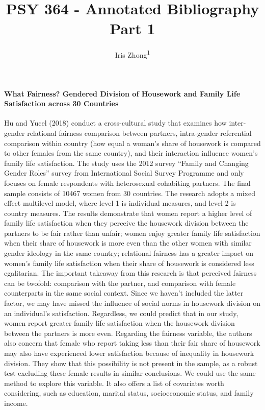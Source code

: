 \documentclass[
  english,
  man]{apa6}
\title{PSY 364 - Annotated Bibliography Part 1}
\author{Iris Zhong\textsuperscript{1}}
\date{}
\affiliation{\vspace{0.5cm}\textsuperscript{1} Smith College}
\let\oldparagraph\paragraph
\renewcommand{\paragraph}[1]{\oldparagraph{#1}\mbox{}}
\begin{document}
\maketitle

\hypertarget{what-fairness-gendered-division-of-housework-and-family-life-satisfaction-across-30-countries}{%
\paragraph{What Fairness? Gendered Division of Housework and Family Life Satisfaction across 30 Countries}\label{what-fairness-gendered-division-of-housework-and-family-life-satisfaction-across-30-countries}}

Hu and Yucel (2018) conduct a cross-cultural study that examines how inter-gender relational fairness comparison between partners, intra-gender referential comparison within country (how equal a woman's share of housework is compared to other females from the same country), and their interaction influence women's family life satisfaction. The study uses the 2012 survey ``Family and Changing Gender Roles'' survey from International Social Survey Programme and only focuses on female respondents with heterosexual cohabiting partners. The final sample consists of 10467 women from 30 countries. The research adopts a mixed effect multilevel model, where level 1 is individual measures, and level 2 is country measures. The results demonstrate that women report a higher level of family life satisfaction when they perceive the housework division between the partners to be fair rather than unfair; women enjoy greater family life satisfaction when their share of housework is more even than the other women with similar gender ideology in the same country; relational fairness has a greater impact on women's family life satisfaction when their share of housework is considered less egalitarian. The important takeaway from this research is that perceived fairness can be twofold: comparison with the partner, and comparison with female counterparts in the same social context. Since we haven't included the latter factor, we may have missed the influence of social norms in housework division on an individual's satisfaction. Regardless, we could predict that in our study, women report greater family life satisfaction when the housework division between the partners is more even. Regarding the fairness variable, the authors also concern that female who report taking less than their fair share of housework may also have experienced lower satisfaction because of inequality in housework division. They show that this possibility is not present in the sample, as a robust test excluding these female results in similar conclusions. We could use the same method to explore this variable. It also offers a list of covariates worth considering, such as education, marital status, socioeconomic status, and family income.
\end{document}
